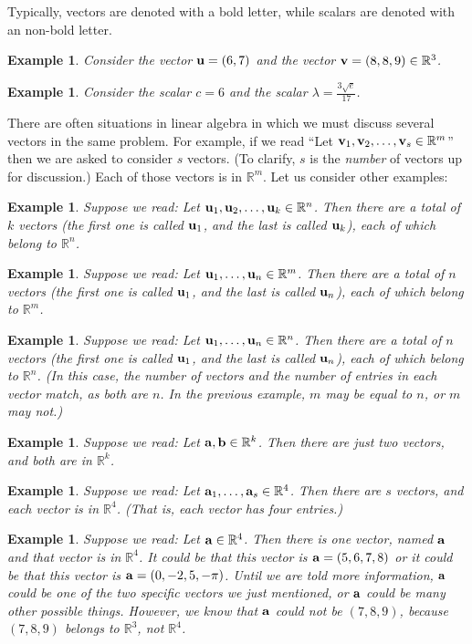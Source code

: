 \documentclass{book}
\newcounter{ekcounter}%
\theoremstyle{ekimcustom}
\newtheorem{example}[ekcounter]{Example}
\begin{document}
Typically, vectors are denoted with a bold letter, while scalars are denoted with an non-bold letter.
\begin{example}
Consider the vector ${\bf u} = (6,7)$ and the vector ${\bf v}=(8,8,9) \in \mathbb{R}^3$.
\end{example}
\begin{example}
Consider the scalar $c =6$ and the scalar $\lambda = \frac{3\sqrt{e}}{17}$.
\end{example}
There are often situations in linear algebra in which we must discuss several vectors in the same problem. For example, if we read ``Let ${\bf v}_1, {\bf v}_2, \dots, {\bf v}_s \in \mathbb{R}^m$'' then we are asked to consider $s$ vectors. (To clarify, $s$ is the \emph{number} of vectors up for discussion.) Each of those vectors is in $\mathbb{R}^m$. Let us consider other examples:
\begin{example}\label{example:reading-carefully-vectors}
Suppose we read: Let ${\bf u}_1, {\bf u}_2, \dots, {\bf u}_k \in \mathbb{R}^n$. Then there are a total of $k$ vectors (the first one is called ${\bf u}_1$, and the last is called ${\bf u}_k$), each of which belong to $\mathbb{R}^n$.
\end{example}
\begin{example}
Suppose we read: Let ${\bf u}_1, \dots, {\bf u}_n \in \mathbb{R}^m$. Then there are a total of $n$ vectors (the first one is called ${\bf u}_1$, and the last is called ${\bf u}_n$), each of which belong to $\mathbb{R}^m$.
\end{example}
\begin{example}
Suppose we read: Let ${\bf u}_1, \dots, {\bf u}_n \in \mathbb{R}^n$. Then there are a total of $n$ vectors (the first one is called ${\bf u}_1$, and the last is called ${\bf u}_n$), each of which belong to $\mathbb{R}^n$. (In this case, the number of vectors and the number of entries in each vector match, as both are $n$. In the previous example, $m$ may be equal to $n$, or $m$ may not.)
\end{example}
\begin{example}
Suppose we read: Let ${\bf a}, {\bf b} \in \mathbb{R}^k$. Then there are just two vectors, and both are in $\mathbb{R}^k$.
\end{example}
\begin{example}
Suppose we read: Let ${\bf a}_1, \dots, {\bf a}_s \in \mathbb{R}^4$. Then there are $s$ vectors, and each vector is in $\mathbb{R}^4$. (That is, each vector has four entries.)
\end{example}
\begin{example}\label{example:vector-in-R4}
Suppose we read: Let ${\bf a} \in \mathbb{R}^4$. Then there is one vector, named ${\bf a}$ and that vector is in $\mathbb{R}^4$. It could be that this vector is ${\bf a} = (5,6,7,8)$ or it could be that this vector is ${\bf a} = (0,-2,5,-\pi)$. Until we are told more information, ${\bf a}$ could be one of the two specific vectors we just mentioned, or ${\bf a}$ could be many other possible things. However, we know that ${\bf a}$ could not be $(7,8,9)$, because $(7,8,9)$ belongs to $\mathbb{R}^3$, not $\mathbb{R}^4$.
\end{example}
\end{document}

